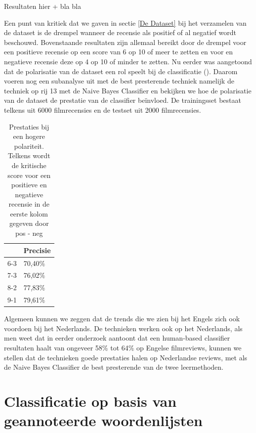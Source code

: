 Resultaten hier + bla bla


Een punt van kritiek dat we gaven in sectie \ref{De Dataset} bij het verzamelen van de dataset is de drempel wanneer de recensie als positief of al negatief wordt beschouwd. Bovenstaande resultaten zijn allemaal bereikt door de drempel voor een positieve recensie op een score van 6 op 10 of meer te zetten en voor en negatieve recensie deze op 4 op 10 of minder te zetten.
Nu eerder was aangetoond dat de polarisatie van de dataset een rol speelt bij de classificatie (\cite{maas-EtAl:2011:ACL-HLT2011}). Daarom voeren nog een subanalyse uit met de best presterende techniek namelijk de techniek op rij 13 met de Naive Bayes Classifier en bekijken we hoe de polarisatie van de dataset de prestatie van de classifier be\"invloed. De trainingsset bestaat telkens uit 6000 filmrecensies en de testset uit 2000 filmrecensies.


\begin{table}[h]
\centering
\caption{Prestaties bij een hogere polariteit. Telkens wordt de kritische score voor een positieve en negatieve recensie in de eerste kolom gegeven door pos - neg  }
\begin{tabular}{l|l|}
\cline{2-2}
                          & Precisie \\ \hline
\multicolumn{1}{|l|}{6-3} & 70,40\%  \\ \hline
\multicolumn{1}{|l|}{7-3} & 76,02\%  \\ \hline
\multicolumn{1}{|l|}{8-2} & 77,83\%  \\ \hline
\multicolumn{1}{|l|}{9-1} & 79,61\%  \\ \hline
\end{tabular}
\end{table}


Algemeen kunnen we zeggen dat de trends die we zien bij het Engels zich ook voordoen bij het Nederlands. De technieken werken ook op het Nederlands, als men weet dat in eerder onderzoek \cite{pang2002thumbs} aantoont dat een human-based classifier resultaten haalt van ongeveer 58\% tot 64\% op Engelse filmreviews, kunnen we stellen dat de technieken goede prestaties halen op Nederlandse reviews, met als de Naive Bayes Classifier de best presterende van de twee leermethoden.


\section{Classificatie op basis van geannoteerde woordenlijsten}\label{Classificatie op basis van geannoteerde woordenlijsten}

